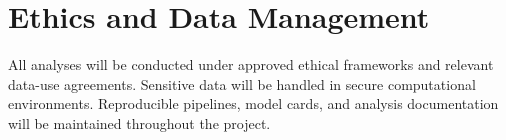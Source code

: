\section{Ethics and Data Management}

All analyses will be conducted under approved ethical frameworks and
relevant data-use agreements. Sensitive data will be handled in secure
computational environments. Reproducible pipelines, model cards, and
analysis documentation will be maintained throughout the project.
